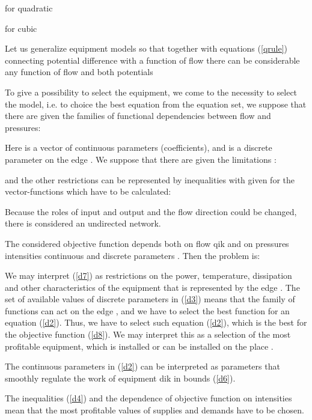 \documentclass{article}
\begin{document}
for quadratic 


for cubic 



Let us generalize equipment models so that together with equations (\ref {qrule}) connecting potential difference with a function of flow there can
be considerable any function of flow and both potentials

To give a possibility to select the equipment, we come to the necessity to
select the model, i.e. to choice the best equation from the equation set, we
suppose that there are given the families of functional dependencies between
flow and pressures:





Here  is a vector of continuous parameters (coefficients), and  is a discrete parameter on the edge . We suppose that there
are given the limitations    
  :





and the other restrictions can be represented by inequalities with given   for the vector-functions  which have to be calculated:



Because the roles of input and output and the flow direction could be
changed, there is considered an undirected network.

The considered objective function depends both on flow qik and on pressures   intensities  continuous  and discrete
parameters  . Then the problem is:





We may interpret (\ref{d7}) as restrictions on the power, temperature,
dissipation and other characteristics of the equipment that is represented
by the edge . The set of available values of discrete parameters  in (\ref{d3}) means that the family of functions  can
act on the edge , and we have to select the best function 
for an equation (\ref{d2}). Thus, we have to select such equation (\ref{d2}), which is the best for the objective function (\ref{d8}). We may interpret
this as a selection of the most profitable equipment, which is installed or
can be installed on the place .

The continuous parameters  in (\ref{d2}) can be interpreted as
parameters that smoothly regulate the work of equipment dik in bounds (\ref {d6}).

The inequalities (\ref{d4}) and the dependence of objective function on
intensities  mean that the most profitable values of supplies and
demands have to be chosen.
\end{document}
